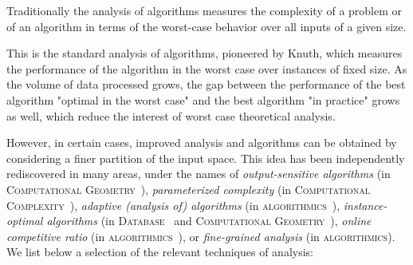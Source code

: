 \documentclass[a4paper,10pt]{article}
\begin{document}
Traditionally the analysis of algorithms measures the complexity of a problem or of an algorithm in terms of the worst-case behavior over all inputs of a given size. \begin{LONG} This is the standard analysis of algorithms, pioneered by Knuth\cite{1968-BOOK-TheArtOfComputerProgramming-Knuth}, which measures the performance of the algorithm in the worst case over instances of fixed size. As the volume of data processed grows, the gap between the performance of the best algorithm "optimal in the worst case" and the best algorithm "in practice" grows as well, which reduce the interest of worst case theoretical analysis.

\end{LONG}
However, in certain cases, improved analysis and algorithms can be obtained by considering a finer partition of the input space.  This idea has been independently rediscovered in many areas, under the names of \emph{output-sensitive algorithms} (in \textsc{Computational Geometry}~\cite{1985-SOCG-OutputSizeSensitiveAlgorithmsForFindingMaximalVectors-KirkpatrickSeidel,1986-JCom-TheUltimatePlanarConvexHullAlgorithm-KirkpatrickSeidel}), \emph{parameterized complexity} (in \textsc{Computational Complexity}~\cite{CyganFKLMPPS15}), \emph{adaptive (analysis of) algorithms} (in \textsc{algorithmics}~\cite{1992-ACJ-AnOverviewOfAdaptiveSorting-MoffatPetersson}), \emph{instance-optimal algorithms} (in \textsc{Database}~\cite{2003-JCSS-OptimalAggregationAlgorithmsForMiddleWare-FaginLotemNaor} and \textsc{Computational Geometry}~\cite{2009-FOCS-InstanceOptimalGeometricAlgorithms-AfshaniBarbayChan}), \emph{online competitive ratio} (in \textsc{algorithmics}~\cite{2007-SODA-OnTheSeparationAndEquivalenceOfPagingStrategies-AngelopoulosDorrigivLopezOrtiz}), or \emph{fine-grained analysis} (in \textsc{algorithmics}). We list below a selection of the relevant techniques of analysis:
\end{document}
